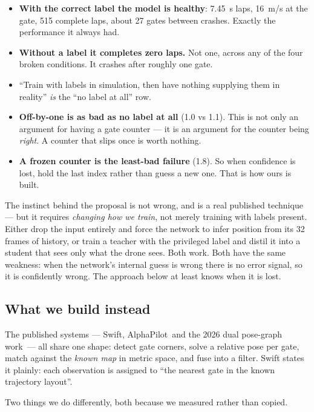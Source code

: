 \begin{verdict}
\begin{itemize}
\item \textbf{With the correct label the model is healthy}: \SI{7.45}{s} laps,
\SI{16}{m/s} at the gate, 515 complete laps, about 27 gates between crashes.
Exactly the performance it always had.
\item \textbf{Without a label it completes zero laps.} Not one, across any of the
four broken conditions. It crashes after roughly one gate.
\item ``Train with labels in simulation, then have nothing supplying them in
reality'' \emph{is} the ``no label at all'' row.
\item \textbf{Off-by-one is as bad as no label at all} (1.0 vs 1.1). This is not
only an argument for having a gate counter --- it is an argument for the counter
being \emph{right}. A counter that slips once is worth nothing.
\item \textbf{A frozen counter is the least-bad failure} (1.8). So when
confidence is lost, hold the last index rather than guess a new one. That is how
ours is built.
\end{itemize}
\end{verdict}

The instinct behind the proposal is not wrong, and is a real published
technique --- but it requires \emph{changing how we train}, not merely training
with labels present. Either drop the input entirely and force the network to
infer position from its 32 frames of history, or train a teacher with the
privileged label and distil it into a student that sees only what the drone
sees. Both work. Both have the same weakness: when the network's internal guess
is wrong there is no error signal, so it is confidently wrong. The approach
below at least knows when it is lost.

\subsection{What we build instead}

The published systems --- Swift\X, AlphaPilot\X\ and the 2026 dual pose-graph
work\X\ --- all share one shape: detect gate corners, solve a relative pose per
gate, match against the \emph{known map} in metric space, and fuse into a filter.
Swift states it plainly: each observation is assigned to ``the nearest gate in
the known trajectory layout''.

Two things we do differently, both because we measured rather than copied.

